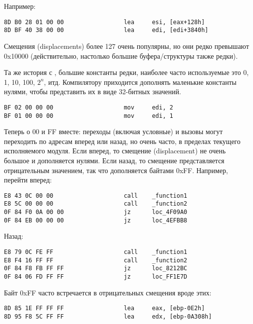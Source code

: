Например:

\begin{lstlisting}[style=customasmx86]
8D B0 28 01 00 00                 lea     esi, [eax+128h]
8D BF 40 38 00 00                 lea     edi, [edi+3840h]
\end{lstlisting}

Смещения (displacements) более 127 очень популярны, но они редко превышают 0x10000
(действительно, настолько большие буфера/структуры также редки).

Та же история с , большие константы редки, наиболее часто используемые это 0, 1, 10, 100, $2^n$, итд.
Компилятору приходится дополнять маленькие константы нулями, чтобы представить их в виде 32-битных значений.

\begin{lstlisting}[style=customasmx86]
BF 02 00 00 00                    mov     edi, 2
BF 01 00 00 00                    mov     edi, 1
\end{lstlisting}

Теперь о 00 и FF вместе: переходы (включая условные) и вызовы могут переходить по адресам вперед или назад, но очень часто,
в пределах текущего исполняемого модуля.
Если вперед, то смещение (displacement) не очень большое и дополняется нулями.
Если назад, то смещение представляется отрицательным значением, так что дополняется байтами 0xFF.
Например, перейти вперед:

\begin{lstlisting}[style=customasmx86]
E8 43 0C 00 00                    call    _function1
E8 5C 00 00 00                    call    _function2
0F 84 F0 0A 00 00                 jz      loc_4F09A0
0F 84 EB 00 00 00                 jz      loc_4EFBB8
\end{lstlisting}

Назад:

\begin{lstlisting}[style=customasmx86]
E8 79 0C FE FF                    call    _function1
E8 F4 16 FF FF                    call    _function2
0F 84 F8 FB FF FF                 jz      loc_8212BC
0F 84 06 FD FF FF                 jz      loc_FF1E7D
\end{lstlisting}

Байт 0xFF часто встречается в отрицательных смещения вроде этих:

\begin{lstlisting}[style=customasmx86]
8D 85 1E FF FF FF                 lea     eax, [ebp-0E2h]
8D 95 F8 5C FF FF                 lea     edx, [ebp-0A308h]
\end{lstlisting}

